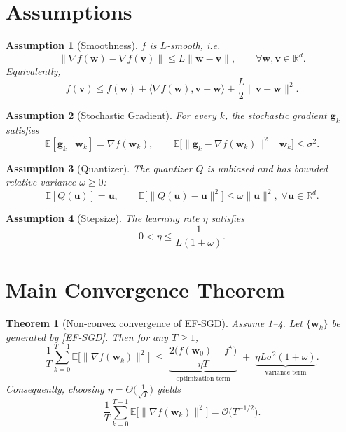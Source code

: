 \documentclass{article}
\newtheorem{theorem}{Theorem}
\newtheorem{assumption}{Assumption}
\newcommand{\E}{\mathbb{E}}
\newcommand{\R}{\mathbb{R}}
\newcommand{\ip}[2]{\langle #1,#2\rangle}
\begin{document}
\section*{Assumptions}
\begin{assumption}[Smoothness]\label{as:smooth}
$f$ is $L$‑smooth, i.e.
\[
\|\nabla f(\bm w)-\nabla f(\bm v)\|\le L\|\bm w-\bm v\|,\qquad\forall\bm w,\bm v\in\R^d .
\tag{A1}
\]
Equivalently,
\[
f(\bm v)\le f(\bm w)+\ip{\nabla f(\bm w)}{\bm v-\bm w}+\frac{L}{2}\|\bm v-\bm w\|^2 .
\tag{A1'}
\]
\end{assumption}
\begin{assumption}[Stochastic Gradient]\label{as:sgd}
For every $k$, the stochastic gradient $\bm g_k$ satisfies
\[
\E[\bm g_k\mid\bm w_k]=\nabla f(\bm w_k),\qquad 
\E\!\big[\|\bm g_k-\nabla f(\bm w_k)\|^2\mid\bm w_k\big]\le\sigma^2 .
\tag{A2}
\]
\end{assumption}
\begin{assumption}[Quantizer]\label{as:quant}
The quantizer $Q$ is unbiased and has bounded relative variance $\omega\ge0$:
\[
\E[Q(\bm u)]=\bm u,\qquad 
\E\!\big[\|Q(\bm u)-\bm u\|^2\big]\le\omega\|\bm u\|^2 ,\;\forall\bm u\in\R^d .
\tag{A3}
\]
\end{assumption}
\begin{assumption}[Stepsize]\label{as:stepsize}
The learning rate $\eta$ satisfies
\[
0<\eta\le\frac{1}{L(1+\omega)} .
\tag{A4}
\]
\end{assumption}

\section*{Main Convergence Theorem}
\begin{theorem}[Non‑convex convergence of EF‑SGD]\label{thm:main}
Assume \ref{as:smooth}–\ref{as:stepsize}. Let $\{\bm w_k\}$ be generated by \eqref{EF‑SGD}. Then for any $T\ge1$,
\[
\frac{1}{T}\sum_{k=0}^{T-1}\E\!\big[\|\nabla f(\bm w_k)\|^2\big]
\;\le\;
\underbrace{\frac{2\big(f(\bm w_0)-f^\star\big)}{\eta T}}_{\text{optimization term}}
\;+\;
\underbrace{\eta L\sigma^2(1+\omega)}_{\text{variance term}} .
\tag{T1}
\]
Consequently, choosing $\eta = \Theta\!\big(\tfrac{1}{\sqrt{T}}\big)$ yields
\[
\frac{1}{T}\sum_{k=0}^{T-1}\E\!\big[\|\nabla f(\bm w_k)\|^2\big]=
\mathcal O\!\big(T^{-1/2}\big).
\]
\end{theorem}
\end{document}
